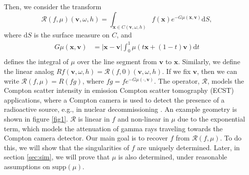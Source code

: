 \documentclass[a4paper,12pt]{amsart}
\numberwithin{equation}{section}
\theoremstyle{plain}
\numberwithin{theorem}{section}
\theoremstyle{definition}
\theoremstyle{remark}
\theoremstyle{remark}
\theoremstyle{remark}
\newcommand{\vv}{{\mathbf{v}}}
\newcommand{\vx}{{\mathbf{x}}}
\begin{document}
Then, we consider the transform
\begin{equation}\label{orig_data}
\mathcal{R}(f, \mu)(\vv, \omega, h) = \int_{\vx\in C(\vv, \omega, h)} f(\vx) e^{ -G\mu(\vx, \vv) } \mathrm{d}S,
\end{equation}
where $\mathrm{d}S$ is the surface measure on $C$, and 
\begin{equation}
\begin{split}
G\mu(\vx, \vv) &= |\vx - \vv| \int_0^1\mu(t\vx + (1-t)\vv)\mathrm{d}t \\
\end{split}
\end{equation}
defines the integral of $\mu$ over the line segment from $\vv$ to $\vx$. Similarly, we define the linear analog $Rf(\vv, \omega, h) = \mathcal{R}(f, 0)(\vv, \omega, h)$. If we fix $\vv$, then we can write $\mathcal{R}(f, \mu) = R(fg)$, where $fg = f e^{ -G\mu(\cdot, \vv) }$. The operator, $\mathcal{R}$, models the Compton scatter intensity in emission Compton scatter tomography (ECST) applications, where a  Compton camera is used to detect the presence of a radioactive source, e.g., in nuclear decommissioning \cite{yao2022rapid}. An example geometry is shown in figure \ref{fig1}. $\mathcal{R}$ is linear in $f$ and non-linear in $\mu$ due to the exponential term, which models the attenuation of gamma rays traveling towards the Compton camera detector. Our main goal is to recover $f$ from $\mathcal{R}(f,\mu)$. To do this, we will show that the singularities of $f$ are uniquely determined. Later, in section \ref{sec:sim}, we will prove that $\mu$ is also determined, under reasonable assumptions on $\text{supp}(\mu)$.

\end{document}
